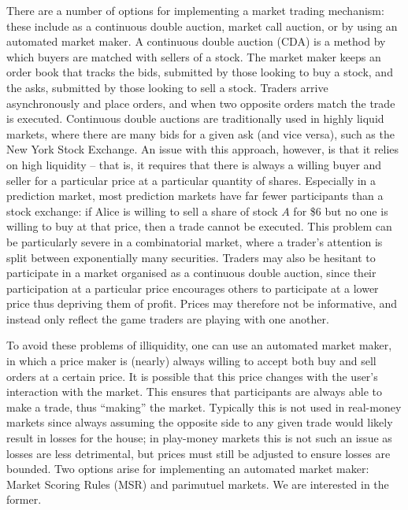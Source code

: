 \label{sec:marketScoringRules}

There are a  number of options for implementing a market trading mechanism:
these include as a continuous double auction, market call auction, or by using
an automated market maker. A continuous double auction (CDA) is a method by
which buyers are matched with sellers of a stock. The market maker keeps an
order book that tracks the bids, submitted by those looking to buy a stock, and
the asks, submitted by those looking to sell a stock. Traders arrive
asynchronously and place orders, and when two opposite orders match the trade
is executed. Continuous double auctions are traditionally used in highly
liquid markets, where there are many bids for a given ask (and vice versa),
such as the New York Stock Exchange. An issue with this approach, however, is
that it relies on high liquidity -- that is, it requires that there is always a
willing buyer and seller for a particular price at a particular quantity of
shares. Especially in a prediction market, most prediction markets have far
fewer participants than a stock exchange: if Alice is willing to sell a share
of stock $A$ for \$6 but no one is willing to buy at that price, then a trade
cannot be executed. This problem can be particularly severe in a combinatorial
market, where a trader's attention is split between exponentially many
securities. Traders may also be hesitant to participate in a market organised
as a continuous double auction, since their participation at a particular price
encourages others to participate at a lower price thus depriving them of
profit. Prices may therefore not be informative, and instead only reflect the
game traders are playing with one another.

To avoid these problems of illiquidity, one can use an automated market maker,
in which a price maker is (nearly) always willing to accept both buy and sell
orders at a certain price. It is possible that this price changes with the
user's interaction with the market. This ensures that participants are always
able to make a trade, thus ``making'' the market. Typically this is not used in
real-money markets since always assuming the opposite side to any given trade
would likely result in losses for the house; in play-money markets this is not
such an issue as losses are less detrimental, but prices must still be adjusted
to ensure losses are bounded. Two options arise for implementing an automated
market maker: Market Scoring Rules (MSR) and parimutuel markets. We are
interested in the former.

